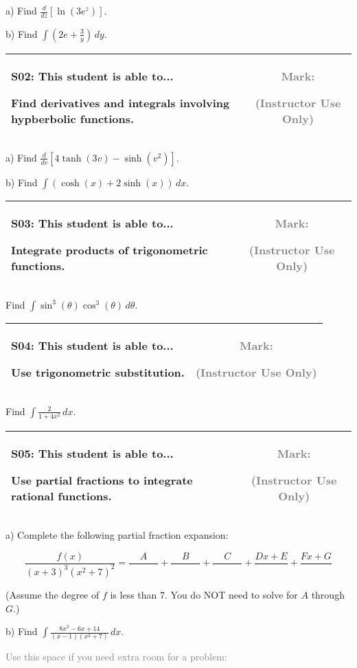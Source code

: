 \documentclass[12pt]{article}
\newcommand{\standardQuestion}[2]{
\newpage
\begin{center}
  \begin{tabular}{|l|c|}
  \hline
    \parbox{5in}{
      \textbf{#1}: This student is able to...\\
      #2
    }
  &
    \parbox{1in}{
      \vspace{0.1in}
      \footnotesize \textcolor{gray}{Mark:}
      \vspace{0.7in}

      \tiny \textcolor{gray}{(Instructor Use Only)}
    }
  \\\hline
  \end{tabular}
\end{center}
}
\begin{document}
a) Find \(\frac{d}{dz}[\ln(3e^z)]\).

\vfill

b) Find \(\displaystyle\int\left(2e+\frac{3}{y}\right)\,dy\).

\vfill



\standardQuestion{S02}{
  Find derivatives and integrals involving hypberbolic functions.
}

a) Find \(\frac{d}{dv}[4\tanh(3v)-\sinh(v^2)]\).

\vfill

b) Find \(\displaystyle\int(\cosh(x)+2\sinh(x))\,dx\).

\vfill



\standardQuestion{S03}{
  Integrate products of trigonometric functions.
}

Find \(\int\sin^3(\theta)\cos^3(\theta)\,d\theta\).



\standardQuestion{S04}{
  Use trigonometric substitution.
}

Find \(\int\frac{2}{1+4x^2}\,dx\).




\standardQuestion{S05}{
  Use partial fractions to integrate rational functions.
}

a) Complete the following partial fraction expansion:

\[
  \frac{f(x)}{(x+3)^3(x^2+7)^2}
    =
  \frac{A}{\hspace{3em}}
    +
  \frac{B}{\hspace{3em}}
    +
  \frac{C}{\hspace{3em}}
    +
  \frac{Dx+E}{\hspace{3em}}
    +
  \frac{Fx+G}{\hspace{3em}}
\]

\vspace{1em}

(Assume the degree of \(f\) is less than \(7\).
You do NOT need to solve for \(A\) through \(G\).)

\vspace{1em}

b) Find \(\int\frac{8x^2-6x+14}{(x-1)(x^2+7)}\,dx\).

\vfill







\newpage

\textcolor{gray}{Use this space if you need extra room for a problem:}
\end{document}
